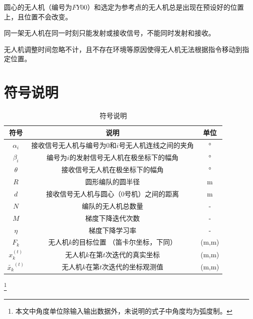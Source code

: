\documentclass[withoutpreface,bwprint]{cumcmthesis} %
\begin{document}
\begin{assumption}
    圆心的无人机（编号为$FY00$）和选定为参考点的无人机总是出现在预设好的位置上，且位置不会改变。
    \label{asu:004}
\end{assumption}

\begin{assumption}
    同一架无人机在同一时刻只能发射或接收信号，不能同时发射和接收。
    \label{asu:005}
\end{assumption}

\begin{assumption}
    无人机调整时间忽略不计，且不存在环境等原因使得无人机无法根据指令移动到指定位置。
    \label{asu:006}
\end{assumption}

\section{符号说明}

\begin{table}[H]
    \caption{符号说明}\label{tab:variable} 
    \centering
    \begin{tabular}{ccc}
        \toprule[1.5pt]
        符号 & 说明 & 单位\\
        \midrule[1pt]
        $\alpha_i$ & 接收信号无人机与编号为0和$i$号无人机连线之间的夹角 & ° \\
        $\beta_i$ & 编号为$i$的发射信号无人机在极坐标下的幅角 & ° \\
        $\theta$ & 接收信号无人机在极坐标下的幅角 & ° \\
        $R$ & 圆形编队的圆半径 & m \\
        $d$ & 接收信号无人机与圆心（0号机）之间的距离 & m \\
        $N$ & 编队的无人机总数量 & - \\
        $M$ & 梯度下降迭代次数 & -\\ 
        $\eta$ & 梯度下降学习率 & -\\
        $F_k$ & 无人机$k$的目标位置 （笛卡尔坐标，下同）& (m,m)\\
        $x_k^{(t)}$ & 无人机$k$在第$t$次迭代的真实坐标 & (m,m) \\
        $\tilde{x_k}^{(t)}$ & 无人机$k$在第$t$次迭代的坐标观测值 & (m,m) \\
        
        \bottomrule[1.5pt]
    \end{tabular}
\end{table}
\footnote{本文中角度单位除输入输出数据外，未说明的式子中角度均为弧度制。}
\end{document}
